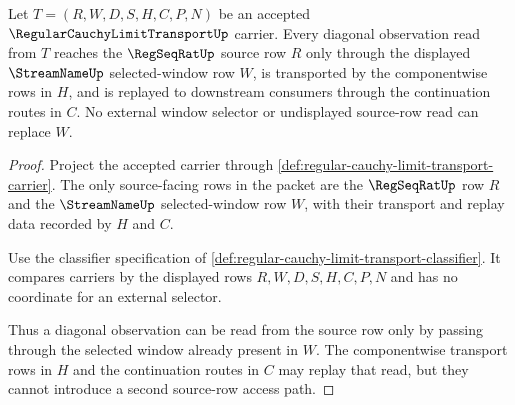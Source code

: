 \begin{theorem}
\label{thm:regular-cauchy-limit-transport-selected-window-exactness}
Let $T=(R,W,D,S,H,C,P,N)$ be an accepted $\RegularCauchyLimitTransportUp$ carrier. Every diagonal observation read from $T$ reaches the $\RegSeqRatUp$ source row $R$ only through the displayed $\StreamNameUp$ selected-window row $W$, is transported by the componentwise rows in $H$, and is replayed to downstream consumers through the continuation routes in $C$. No external window selector or undisplayed source-row read can replace $W$.
\end{theorem}
\begin{proof}
Project the accepted carrier through \autoref{def:regular-cauchy-limit-transport-carrier}. The only source-facing rows in the packet are the $\RegSeqRatUp$ row $R$ and the $\StreamNameUp$ selected-window row $W$, with their transport and replay data recorded by $H$ and $C$.

Use the classifier specification of \autoref{def:regular-cauchy-limit-transport-classifier}. It compares carriers by the displayed rows $R,W,D,S,H,C,P,N$ and has no coordinate for an external selector.

Thus a diagonal observation can be read from the source row only by passing through the selected window already present in $W$. The componentwise transport rows in $H$ and the continuation routes in $C$ may replay that read, but they cannot introduce a second source-row access path.
\end{proof}

